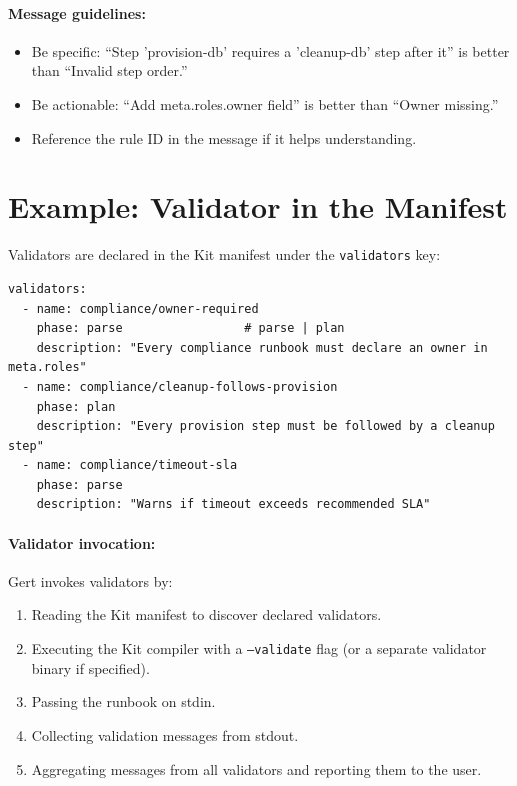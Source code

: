 \paragraph{Message guidelines:}

\begin{itemize}
  \item Be specific: ``Step 'provision-db' requires a 'cleanup-db' step after it''
    is better than ``Invalid step order.''
  \item Be actionable: ``Add meta.roles.owner field'' is better than ``Owner missing.''
  \item Reference the rule ID in the message if it helps understanding.
\end{itemize}

\section{Example: Validator in the Manifest}
\label{sec:validator-manifest}

Validators are declared in the Kit manifest under the \texttt{validators} key:

\begin{verbatim}
validators:
  - name: compliance/owner-required
    phase: parse                 # parse | plan
    description: "Every compliance runbook must declare an owner in meta.roles"
  - name: compliance/cleanup-follows-provision
    phase: plan
    description: "Every provision step must be followed by a cleanup step"
  - name: compliance/timeout-sla
    phase: parse
    description: "Warns if timeout exceeds recommended SLA"
\end{verbatim}

\paragraph{Validator invocation:}

Gert invokes validators by:

\begin{enumerate}
  \item Reading the Kit manifest to discover declared validators.
  \item Executing the Kit compiler with a \texttt{--validate} flag (or a
    separate validator binary if specified).
  \item Passing the runbook on stdin.
  \item Collecting validation messages from stdout.
  \item Aggregating messages from all validators and reporting them to the user.
\end{enumerate}

